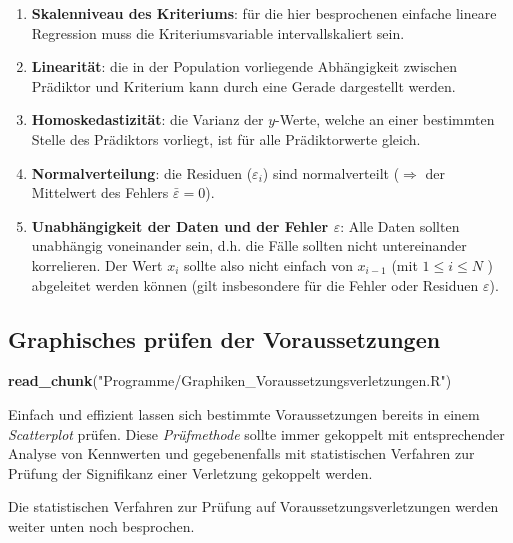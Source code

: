 \documentclass[
]{article}
\newenvironment{Shaded}{\begin{snugshade}}{\end{snugshade}}
\newcommand{\FunctionTok}[1]{\textcolor[rgb]{0.13,0.29,0.53}{\textbf{#1}}}
\newcommand{\NormalTok}[1]{#1}
\newcommand{\StringTok}[1]{\textcolor[rgb]{0.31,0.60,0.02}{#1}}
\providecommand{\tightlist}{%
  \setlength{\itemsep}{0pt}\setlength{\parskip}{0pt}}
\begin{document}
\begin{enumerate}
\def\labelenumi{\arabic{enumi}.}
\tightlist
\item
  \textbf{Skalenniveau des Kriteriums}: für die hier besprochenen einfache lineare Regression muss die Kriteriumsvariable intervallskaliert sein.
\item
  \textbf{Linearität}: die in der Population vorliegende Abhängigkeit zwischen Prädiktor und Kriterium kann durch eine Gerade dargestellt werden.
\item
  \textbf{Homoskedastizität}: die Varianz der \(y\)-Werte, welche an einer bestimmten Stelle des Prädiktors vorliegt, ist für alle Prädiktorwerte gleich.
\item
  \textbf{Normalverteilung}: die Residuen (\(\varepsilon_i\)) sind normalverteilt (\(\Rightarrow\) der Mittelwert des Fehlers \(\bar{\varepsilon} = 0\)).
\item
  \textbf{Unabhängigkeit der Daten und der Fehler \(\varepsilon\)}: Alle Daten sollten unabhängig voneinander sein, d.h. die Fälle sollten nicht untereinander korrelieren. Der Wert \(x_i\) sollte also nicht einfach von \(x_{i-1}\) (mit \(1 \leq i \leq N\) ) abgeleitet werden können (gilt insbesondere für die Fehler oder Residuen \(\varepsilon\)).
\end{enumerate}

\subsection*{Graphisches prüfen der Voraussetzungen}\label{graphisches-pruxfcfen-der-voraussetzungen}

\begin{Shaded}
\begin{Highlighting}[]
  \FunctionTok{read\_chunk}\NormalTok{(}\StringTok{"Programme/Graphiken\_Voraussetzungsverletzungen.R"}\NormalTok{)}
\end{Highlighting}
\end{Shaded}

Einfach und effizient lassen sich bestimmte Voraussetzungen bereits in einem \emph{Scatterplot} prüfen. Diese \emph{Prüfmethode} sollte immer gekoppelt mit entsprechender Analyse von Kennwerten und gegebenenfalls mit statistischen Verfahren zur Prüfung der Signifikanz einer Verletzung gekoppelt werden.

Die statistischen Verfahren zur Prüfung auf Voraussetzungsverletzungen werden weiter unten noch besprochen.
\end{document}
